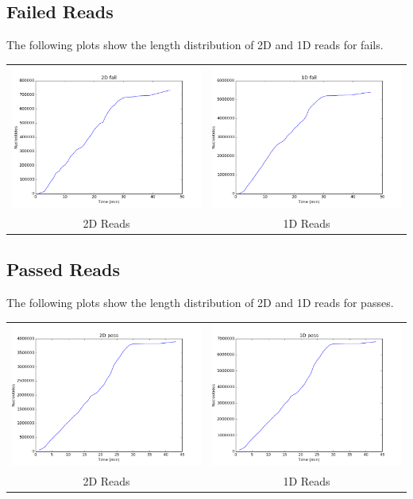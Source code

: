 \subsection*{Failed Reads}

        The following plots show the length distribution of 2D and 1D reads for fails.
       
        \begin{tabular}{cc}
          \includegraphics[width=.48\textwidth]{failcum2D}
          &
          \includegraphics[width=.48\textwidth]{failcum1D}
          \\
          2D Reads
          &
          1D Reads
        \end{tabular}

\subsection*{Passed Reads}

        The following plots show the length distribution of 2D and 1D reads for passes.

        
        \begin{tabular}{cc}
          \includegraphics[width=.48\textwidth]{passcum2D}
          &
          \includegraphics[width=.48\textwidth]{passcum1D}
          \\
          2D Reads
          &
          1D Reads
        \end{tabular}
